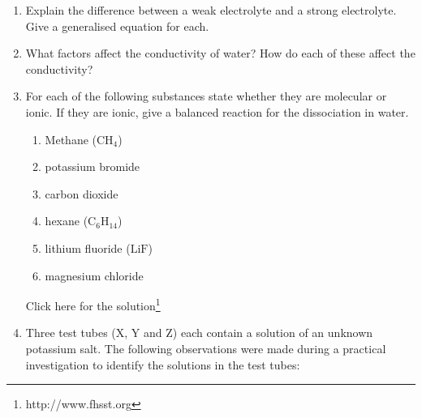 \begin{enumerate}[noitemsep, label=\textbf{\arabic*}. ]
\begin{enumerate}[noitemsep, label=\textbf{\alph*}. ]
\begin{enumerate}[noitemsep, label=\textbf{\roman*}. ]
\label{m38719*uid116}\item ${\mathrm{PbBr}}_{2}$\label{m38719*uid117}\item ${\mathrm{H}}_{2}\mathrm{O}$
\label{m38719*uid118}\item ${\mathrm{I}}_{2}$\end{enumerate}
(IEB Paper 2, 2003)
\label{m38719*uid119}\item The following substances are dissolved in water. Which one of the solutions is basic?
\label{m38719*id343275}\begin{enumerate}[noitemsep, label=\textbf{\roman*}. ] 
            \label{m38719*uid120}\item sodium nitrate
\label{m38719*uid121}\item calcium sulphate
\label{m38719*uid122}\item ammonium chloride
\label{m38719*uid123}\item potassium carbonate
\end{enumerate}
(IEB Paper 2, 2005)
\end{enumerate}
        \item Explain the difference between a weak electrolyte and a strong electrolyte. Give a generalised equation for each.\newline
            \item What factors affect the conductivity of water? How do each of these affect the conductivity?\newline
            \item For each of the following substances state whether they are molecular or ionic. If they are ionic, give a balanced reaction for the dissociation in water.\label{m38719*id7342}\begin{enumerate}[noitemsep, label=\textbf{\alph*}. ] 
            \item Methane (${\mathrm{CH}}_{4}$)\item potassium bromide\item carbon dioxide\item hexane (${\mathrm{C}}_{6}{\mathrm{H}}_{14}$)\item lithium fluoride ($\mathrm{LiF}$)\item magnesium chloride\end{enumerate}
        Click here for the solution\footnote{http://www.fhsst.org}
\label{m38719*uid127}\item Three test tubes (X, Y and Z) each contain a solution of an unknown potassium salt. The following observations were made during a practical investigation to identify the solutions in the test tubes:

\end{enumerate}
